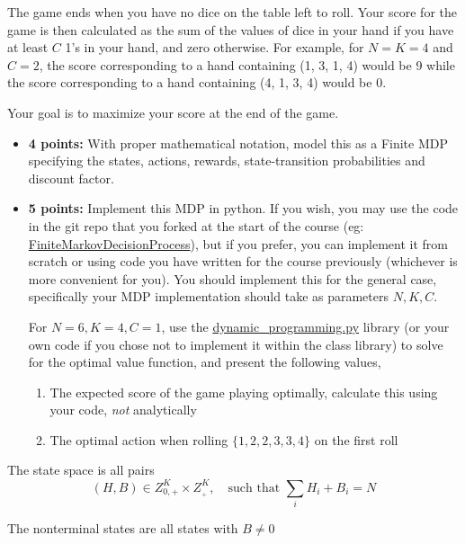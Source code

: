 \documentclass[12pt]{exam}
\begin{document}
\begin{questions}
The game ends when you have no dice on the table left to roll. Your score for the game is then calculated as the sum of the values of dice in your hand if you have at least $C$ 1's in your hand, and zero otherwise. For example, for $N=K=4$ and $C=2$, the score corresponding to a hand containing (1, 3, 1, 4) would be 9 while the score corresponding to a hand containing (4, 1, 3, 4) would be 0.
    
Your goal is to maximize your score at the end of the game.

\begin{itemize}
\item {\bf 4 points:} With proper mathematical notation, model this as a Finite MDP specifying the states, actions, rewards, state-transition probabilities and discount factor.
\item {\bf 5 points:} Implement this MDP in python. If you wish, you may use the code in the git repo that you forked at the start of the course (eg: \href{https://github.com/TikhonJelvis/RL-book/blob/master/rl/markov\_decision\_process.py#L232}{FiniteMarkovDecisionProcess}), but if you prefer, you can implement it from scratch or using code you have written for the course previously (whichever is more convenient for you). You should implement this for the general case, specifically your MDP implementation should take as parameters $N,K,C$.

For $N=6, K=4, C=1$, use the  \href{https://github.com/TikhonJelvis/RL-book/blob/master/rl/dynamic_programming.py}{dynamic\_programming.py} library (or your own code if you chose not to implement it within the class library) to solve for the optimal value function, and present the following values, 
\begin{enumerate}
    \item The expected score of the game playing optimally, calculate this using your code, {\em not } analytically
    \item The optimal action when rolling $\{1,2,2,3,3,4\}$ on the first roll
\end{enumerate}

\end{itemize}

\begin{solution}

The state space is all pairs
\[(H, B) \in Z_{0,+}^K \times Z_{_+}^K,\quad \text{such that } \sum_{i} H_i + B_i = N\]

The nonterminal states are all states with $B\neq 0$


\end{solution}
\end{questions}
\end{document}
